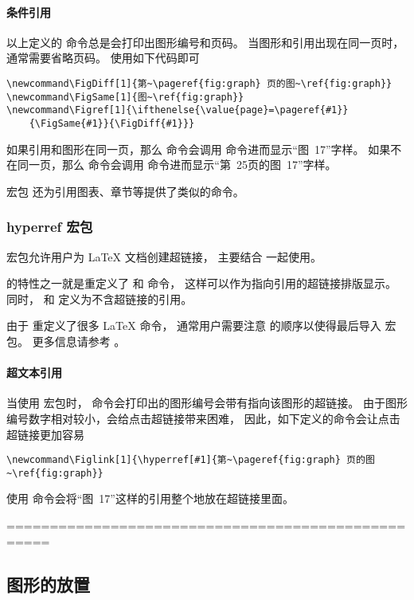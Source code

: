 \paragraph{条件引用}
以上定义的  命令总是会打印出图形编号和页码。
当图形和引用出现在同一页时，通常需要省略页码。
使用如下代码即可
\begin{lstlisting}
\newcommand\FigDiff[1]{第~\pageref{fig:graph} 页的图~\ref{fig:graph}}
\newcommand\FigSame[1]{图~\ref{fig:graph}}
\newcommand\Figref[1]{\ifthenelse{\value{page}=\pageref{#1}}
	{\FigSame{#1}}{\FigDiff{#1}}}
\end{lstlisting}
如果引用和图形在同一页，那么  命令会调用  命令进而显示“图~17”字样。
如果不在同一页，那么  命令会调用  命令进而显示“第~25页的图~17”字样。

宏包  \cite{varioref-doc} 还为引用图表、章节等提供了类似的命令。

\subsubsection{hyperref 宏包}\label{sssec:hyperref}

 宏包允许用户为 \LaTeX{} 文档创建超链接，
主要结合  一起使用。

 的特性之一就是重定义了  和  命令，
这样可以作为指向引用的超链接排版显示。
同时， 和  定义为不含超链接的引用。

由于  重定义了很多 \LaTeX{} 命令，
通常用户需要注意  的顺序以使得最后导入  宏包。
更多信息请参考 \cite{hyperref-manual}。

\paragraph{超文本引用}
当使用  宏包时， 命令会打印出的图形编号会带有指向该图形的超链接。
由于图形编号数字相对较小，会给点击超链接带来困难，
因此，如下定义的命令会让点击超链接更加容易
\begin{lstlisting}
\newcommand\Figlink[1]{\hyperref[#1]{第~\pageref{fig:graph} 页的图~\ref{fig:graph}}
\end{lstlisting}
使用  命令会将“图~17”这样的引用整个地放在超链接里面。

===================================================
\subsection{图形的放置}\label{ssec:figplacement}

